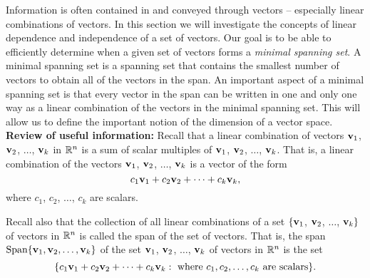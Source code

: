 Information is often contained in and conveyed through vectors -- especially linear combinations of vectors. In this section we will investigate the concepts of linear dependence and independence of a set of vectors. Our goal is to be able to efficiently determine when a given set of vectors forms a \emph{minimal spanning set}. A minimal spanning set is a spanning set that contains the smallest number of vectors to obtain all of the vectors in the span. An important aspect of a minimal spanning set is that every vector in the span can be written in one and only one way as a linear combination of the vectors in the minimal spanning set. This will allow us to define the important notion of the dimension of a vector space. \\

\noindent \textbf{Review of useful information:} Recall that a linear combination of vectors $\mathbf{v}_1$, $\mathbf{v}_2$, $\ldots$, $\mathbf{v}_k$ in $\mathbb{R}^n$ is a sum of scalar multiples of $\mathbf{v}_1$, $\mathbf{v}_2$, $\ldots$, $\mathbf{v}_k$. That is, a linear combination of the vectors $\mathbf{v}_1$, $\mathbf{v}_2$, $\ldots$, $\mathbf{v}_k$ is a vector of the form
\[c_1\mathbf{v}_1 + c_2\mathbf{v}_2 + \cdots + c_k\mathbf{v}_k,\]
where $c_1$, $c_2$, $\ldots$, $c_k$ are scalars.

Recall also that the collection of all linear combinations of a set $\{\mathbf{v}_1$, $\mathbf{v}_2$, $\ldots$, $\mathbf{v}_k\}$ of vectors in $\mathbb{R}^n$ is called the span of the set of vectors. That is, the span $\text{Span} \{\mathbf{v}_1, \mathbf{v}_2, \ldots, \mathbf{v}_k\}$ of the set $\mathbf{v}_1$, $\mathbf{v}_2$, $\ldots$, $\mathbf{v}_k$ of vectors in $\mathbb{R}^n$ is the set
\[ \{c_1\mathbf{v}_1 + c_2\mathbf{v}_2 + \cdots + c_k\mathbf{v}_k : \text{ where } c_1, c_2, \ldots, c_k \text{ are scalars}\}.\]

